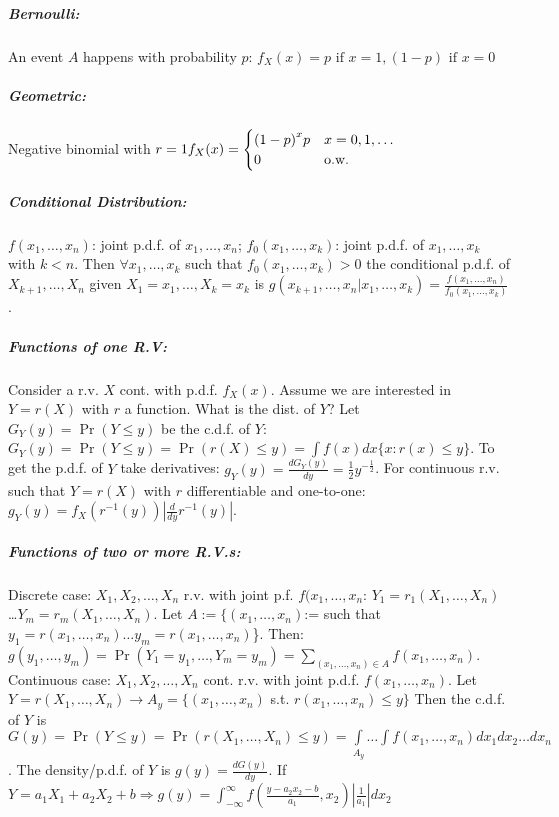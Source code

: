 \documentclass[landscape,10pt]{article}
\begin{document}
\begin{multicols}{4}
    \subparagraph*{Bernoulli: }
        An event \(A\) happens with probability \(p\): \(f_X(x) = p \text{ if } x = 1, (1-p) \text{ if } x = 0\)

    \subparagraph*{Geometric: }
        Negative binomial with \(r=1 \\
        f_X(x) = \begin{cases} {(1-p)}^x p & x=0,1,\ldots \\ 0 & \text{o.w.} \end{cases}\)


\subparagraph*{Conditional Distribution: }
 \(f(x_1, \ldots, x_n)\): joint p.d.f. of \(x_1, \ldots, x_n\); \(f_0(x_1, \ldots, x_k)\): joint p.d.f. of \(x_1, \ldots, x_k\) with \(k < n\). Then \(\forall x_1,\ldots, x_k\) such that \(f_0(x_1, \ldots, x_k) > 0\) the conditional p.d.f. of \(X_{k+1},\ldots,X_n\) given \(X_1 = x_1, \ldots, X_k = x_k\) is \(g(x_{k+1},\ldots,x_n | x_1, \ldots, x_k) = \frac{f(x_1, \ldots, x_n)}{f_0(x_1, \ldots, x_k)}\).

 \subparagraph*{Functions of one R.V: }
    Consider a r.v. \(X\) cont. with p.d.f. \(f_X(x)\). Assume we are interested in \(Y=r(X)\) with \(r\) a function. What is the dist. of \(Y\)? Let \(G_Y(y) = \Pr(Y \leq y)\) be the c.d.f. of \(Y\): \(G_Y(y) = \Pr(Y \leq y) = \Pr(r(X) \leq y) = \int{f(x)}dx \{x: r(x) \leq y\} \). To get the p.d.f. of \(Y\) take derivatives: \(g_Y(y) = \frac{dG_Y(y)}{dy} = \frac{1}{2} y^{-\frac{1}{2}}\). For continuous r.v. such that \(Y = r(X)\) with \(r\) differentiable and one-to-one: \(g_Y(y) = f_X(r^{-1}(y))\left|\frac{d}{dy} r^{-1} (y) \right|\).

\subparagraph*{Functions of two or more R.V.s:}
 Discrete case: \(X_1, X_2, \ldots, X_n\) r.v. with joint p.f. \(f(x_1, \ldots, x_n\):
\(Y_1 = r_1(X_1,\ldots,X_n)\) \dots \(Y_m = r_m(X_1,\ldots,X_n)\). Let \(A := \{(x_1,\ldots,x_n)\):= such that \(y_1 = r(x_1,\ldots,x_n) \dots y_m = r(x_1,\ldots,x_n)\)\}. Then: \(g(y_1,\ldots,y_m)=\Pr(Y_1=y_1,\ldots,Y_m=y_m)=\sum\limits_{(x_1,\ldots,x_n)\in A}{f(x_1,\ldots,x_n)}\). \\

Continuous case: \(X_1, X_2, \ldots, X_n\) cont. r.v. with joint p.d.f. \(f(x_1, \ldots, x_n)\). Let \(Y = r(X_1,\ldots,X_n) \rightarrow A_y = \{(x_1,\ldots,x_n)\) s.t. \(r(x_1,\ldots,x_n) \leq y\}\) Then the c.d.f. of \(Y\) is \(G(y) = \Pr(Y \leq y) = \Pr\left( r(X_1,\ldots,X_n) \leq y \right) = \int\limits_{A_y}\ldots\int{f(x_1,\ldots,x_n)}dx_1dx_2\ldots dx_n\). The density/p.d.f. of \(Y\) is \(g(y) = \frac{dG(y)}{dy}\). If \(Y = a_1 X_1 + a_2 X_2 + b \Rightarrow g(y) = \int_{-\infty}^{\infty}f\left(\frac{y-a_2 x_2 - b}{a_1},x_2\right)\left|\frac{1}{a_1}\right|dx_2\)


\end{multicols}
\end{document}
